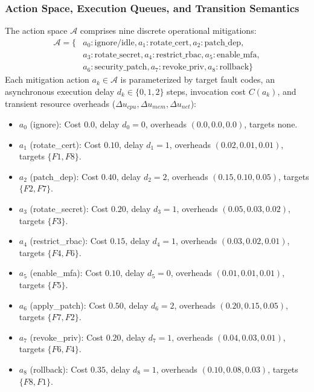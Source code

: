 \documentclass[11pt,a4paper]{article}
\begin{document}
\subsubsection{Action Space, Execution Queues, and Transition Semantics}
\label{subsec:action_space}
The action space $\mathcal{A}$ comprises nine discrete operational mitigations:
\begin{align}
    \label{eq:action_space}
    \mathcal{A} = \{ & a_0: \text{ignore/idle}, a_1: \text{rotate\_cert}, a_2: \text{patch\_dep}, \nonumber \\
    & a_3: \text{rotate\_secret}, a_4: \text{restrict\_rbac}, a_5: \text{enable\_mfa}, \nonumber \\
    & a_6: \text{security\_patch}, a_7: \text{revoke\_priv}, a_8: \text{rollback} \}
\end{align}
Each mitigation action $a_k \in \mathcal{A}$ is parameterized by target fault codes, an asynchronous execution delay $d_k \in \{0, 1, 2\}$ steps, invocation cost $C(a_k)$, and transient resource overheads ($\Delta u_{cpu}, \Delta u_{mem}, \Delta u_{net}$):
\begin{itemize}
    \item $a_0$ (ignore): Cost $0.0$, delay $d_0 = 0$, overheads $(0.0, 0.0, 0.0)$, targets none.
    \item $a_1$ (rotate\_cert): Cost $0.10$, delay $d_1 = 1$, overheads $(0.02, 0.01, 0.01)$, targets $\{F1, F8\}$.
    \item $a_2$ (patch\_dep): Cost $0.40$, delay $d_2 = 2$, overheads $(0.15, 0.10, 0.05)$, targets $\{F2, F7\}$.
    \item $a_3$ (rotate\_secret): Cost $0.20$, delay $d_3 = 1$, overheads $(0.05, 0.03, 0.02)$, targets $\{F3\}$.
    \item $a_4$ (restrict\_rbac): Cost $0.15$, delay $d_4 = 1$, overheads $(0.03, 0.02, 0.01)$, targets $\{F4, F6\}$.
    \item $a_5$ (enable\_mfa): Cost $0.10$, delay $d_5 = 0$, overheads $(0.01, 0.01, 0.01)$, targets $\{F5\}$.
    \item $a_6$ (apply\_patch): Cost $0.50$, delay $d_6 = 2$, overheads $(0.20, 0.15, 0.05)$, targets $\{F7, F2\}$.
    \item $a_7$ (revoke\_priv): Cost $0.20$, delay $d_7 = 1$, overheads $(0.04, 0.03, 0.01)$, targets $\{F6, F4\}$.
    \item $a_8$ (rollback): Cost $0.35$, delay $d_8 = 1$, overheads $(0.10, 0.08, 0.03)$, targets $\{F8, F1\}$.
\end{itemize}
\end{document}

